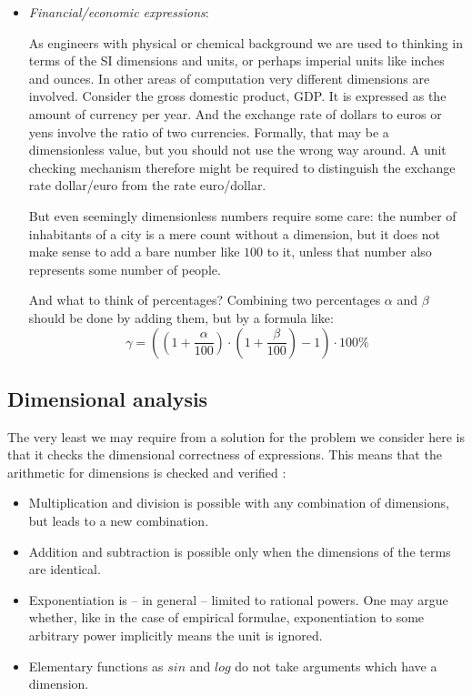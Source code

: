 \documentclass{article}
\begin{document}
\begin{itemize}
\item
\emph{Financial/economic expressions}:

As engineers with physical or chemical background we are used to thinking in terms of the SI dimensions and units, or
perhaps imperial units like inches and ounces. In other areas of computation very different dimensions are involved.
Consider the gross domestic product, GDP. It is expressed as the amount of currency per year. And the
exchange rate of dollars to euros or yens involve the ratio of two currencies. Formally, that may be a dimensionless
value, but you should not use the wrong way around. A unit checking mechanism therefore might be required to
distinguish the exchange rate dollar/euro from the rate euro/dollar.

But even seemingly dimensionless numbers require some care: the number of inhabitants of a city is a mere count without
a dimension, but it does not make sense to add a bare number like $100$ to it, unless that number also represents some
number of people.

And what to think of percentages? Combining two percentages $\alpha$ and $\beta$ should be done by adding them, but by
a formula like:
\begin{equation}
    \gamma = ((1 + \frac{\alpha}{100}) \cdot (1 + \frac{\beta}{100}) - 1) \cdot 100\%
\end{equation}
\end{itemize}

\subsection*{Dimensional analysis}

The very least we may require from a solution for the problem we consider here is that it checks the dimensional correctness
of expressions. This means that the arithmetic for dimensions is checked and verified \cite{DimensionalAnalysis}:
\begin{itemize}
\item
Multiplication and division is possible with any combination of dimensions, but leads to a new combination.
\item
Addition and subtraction is possible only when the dimensions of the terms are identical.
\item
Exponentiation is -- in general -- limited to rational powers. One may argue whether, like in the case of empirical
formulae, exponentiation to some arbitrary power implicitly means the unit is ignored.
\item
Elementary functions as $sin$ and $log$ do not take arguments which have a dimension.
\end{itemize}
\end{document}
